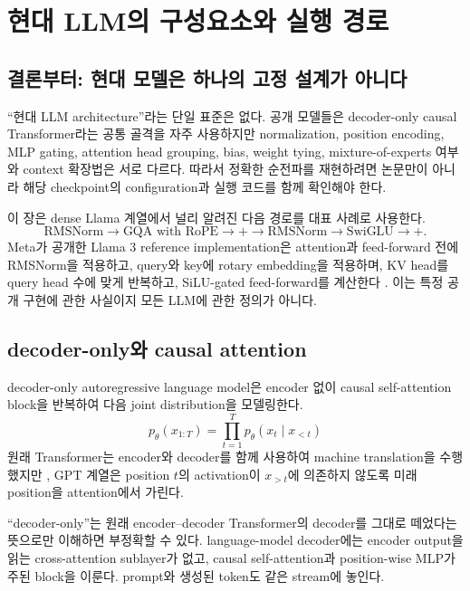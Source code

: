 \chapter{현대 LLM의 구성요소와 실행 경로}
\label{chap:phase3}

\section{결론부터: 현대 모델은 하나의 고정 설계가 아니다}

``현대 LLM architecture''라는 단일 표준은 없다.
공개 모델들은 decoder-only causal Transformer라는 공통 골격을 자주 사용하지만 normalization, position encoding, MLP gating, attention head grouping, bias, weight tying, mixture-of-experts 여부와 context 확장법은 서로 다르다.
따라서 정확한 순전파를 재현하려면 논문만이 아니라 해당 checkpoint의 configuration과 실행 코드를 함께 확인해야 한다.

이 장은 dense Llama 계열에서 널리 알려진 다음 경로를 대표 사례로 사용한다.
\begin{equation}
  \text{RMSNorm}\to\text{GQA with RoPE}\to+
  \to\text{RMSNorm}\to\text{SwiGLU}\to+.
\end{equation}
Meta가 공개한 Llama 3 reference implementation은 attention과 feed-forward 전에 RMSNorm을 적용하고, query와 key에 rotary embedding을 적용하며, KV head를 query head 수에 맞게 반복하고, SiLU-gated feed-forward를 계산한다 \citep{meta2024llama3code,grattafiori2024llama3}.
이는 특정 공개 구현에 관한 사실이지 모든 LLM에 관한 정의가 아니다.

\section{decoder-only와 causal attention}

decoder-only autoregressive language model은 encoder 없이 causal self-attention block을 반복하여 다음 joint distribution을 모델링한다.
\begin{equation}
  p_{\theta}(x_{1:T})=\prod_{t=1}^{T}p_{\theta}(x_t\mid x_{<t})
\end{equation}
원래 Transformer는 encoder와 decoder를 함께 사용하여 machine translation을 수행했지만 \citep{vaswani2017attention}, GPT 계열은 position $t$의 activation이 $x_{>t}$에 의존하지 않도록 미래 position을 attention에서 가린다.

``decoder-only''는 원래 encoder--decoder Transformer의 decoder를 그대로 떼었다는 뜻으로만 이해하면 부정확할 수 있다.
language-model decoder에는 encoder output을 읽는 cross-attention sublayer가 없고, causal self-attention과 position-wise MLP가 주된 block을 이룬다.
prompt와 생성된 token도 같은 stream에 놓인다.

